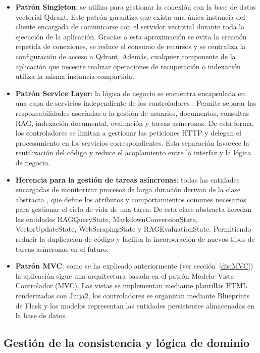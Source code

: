 \begin{itemize}
	\item \textbf{Patrón Singleton}: se utiliza para gestionar la conexión con la base de datos vectorial Qdrant. Este patrón garantiza que exista una única instancia del cliente encargada de comunicarse con el servidor vectorial durante toda la ejecución de la aplicación. Gracias a esta aproximación se evita la creación repetida de conexiones, se reduce el consumo de recursos y se centraliza la configuración de acceso a Qdrant. Además, cualquier componente de la aplicación que necesite realizar operaciones de recuperación o indexación utiliza la misma instancia compartida.
	\item \textbf{Patrón Service Layer}: la lógica de negocio se encuentra encapsulada en una capa de servicios independiente de los controladores . Permite separar las responsabilidades asociadas a la gestión de usuarios, documentos, consultas RAG, indexación documental, evaluación y tareas asíncronas. De esta forma, los controladores se limitan a gestionar las peticiones HTTP y delegan el procesamiento en los servicios correspondientes. Esta separación favorece la reutilización del código y reduce el acoplamiento entre la interfaz  y la lógica de negocio.
	\item \textbf{Herencia para la gestión de tareas asíncronas}: todas las entidades encargadas de monitorizar procesos de larga duración derivan de la clase abstracta , que define los atributos y comportamientos comunes necesarios para gestionar el ciclo de vida de una tarea. De esta clase abstracta heredan las entidades RAGQueryState, MarkdownConversionState, VectorUpdateState, WebScrapingState y RAGEvaluationState. Permitiendo reducir la duplicación de código y facilita la incorporación de nuevos tipos de tareas asíncronas en el futuro.
\item \textbf{Patrón MVC}: como se ha explicado anteriormente (ver sección~\ref{dis:MVC}) la aplicación  sigue una arquitectura basada en el patrón Modelo--Vista--Controlador (MVC). Las vistas se implementan mediante plantillas HTML renderizadas con Jinja2, los controladores se organizan mediante Blueprints de Flask y los modelos representan las entidades persistentes almacenadas en la base de datos.
\end{itemize}

\subsection{Gestión de la consistencia y lógica de dominio}

